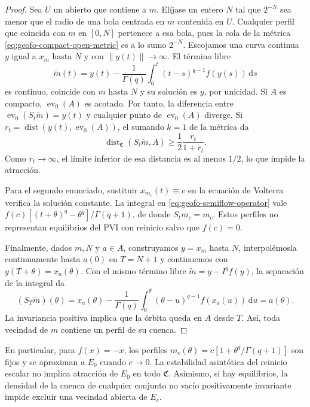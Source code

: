 \begin{proof}
Sea \(U\) un abierto que contiene a \(m\). Elíjase un entero \(N\) tal
que \(2^{-N}\) sea menor que el radio de una bola centrada en \(m\)
contenida en \(U\). Cualquier perfil que coincida con \(m\) en \([0,N]\)
pertenece a esa bola, pues la cola de la métrica
\cref{eq:geofo-compact-open-metric} es a lo sumo \(2^{-N}\).
Escojamos una curva continua \(y\) igual a \(x_m\) hasta \(N\) y con
\(\|y(t)\|\to\infty\). El término libre
\[
 \widetilde m(t)=y(t)-\frac1{\Gamma(q)}
 \int_0^t(t-s)^{q-1}f(y(s))\,\mathrm ds
\]
es continuo, coincide con \(m\) hasta \(N\) y su solución es \(y\), por
unicidad. Si \(A\) es compacto, \(\operatorname{ev}_0(A)\) es acotado.
Por tanto, la diferencia entre \(\operatorname{ev}_0(S_t\widetilde m)=y(t)\)
y cualquier punto de \(\operatorname{ev}_0(A)\) diverge. Si
\(r_t=\operatorname{dist}(y(t),\operatorname{ev}_0(A))\), el sumando
\(k=1\) de la métrica da
\[
 \operatorname{dist}_{\mathfrak C}(S_t\widetilde m,A)
 \geq\frac12\frac{r_t}{1+r_t}.
\]
Como \(r_t\to\infty\), el límite inferior de esa distancia es al menos
\(1/2\), lo que impide la atracción.

Para el segundo enunciado, sustituir \(x_{m_c}(t)\equiv c\) en la ecuación
de Volterra verifica la solución constante. La integral en
\cref{eq:geofo-semiflow-operator} vale
\(f(c)[(t+\theta)^q-\theta^q]/\Gamma(q+1)\), de donde
\(S_tm_c=m_c\). Estos perfiles no representan equilibrios del PVI con
reinicio salvo que \(f(c)=0\).

Finalmente, dados \(m,N\) y \(a\in A\), construyamos \(y=x_m\) hasta
\(N\), interpolémosla continuamente hasta \(a(0)\) en \(T=N+1\) y
continuemos con \(y(T+\theta)=x_a(\theta)\). Con el mismo término libre
\(\widetilde m=y-I^qf(y)\), la separación de la integral da
\[
 (S_T\widetilde m)(\theta)
 =x_a(\theta)-\frac1{\Gamma(q)}
   \int_0^\theta(\theta-u)^{q-1}f(x_a(u))\,\mathrm du
 =a(\theta).
\]
La invariancia positiva implica que la órbita queda en \(A\) desde \(T\).
Así, toda vecindad de \(m\) contiene un perfil de su cuenca.
\end{proof}

En particular, para \(f(x)=-x\), los perfiles
\(m_c(\theta)=c[1+\theta^q/\Gamma(q+1)]\) son fijos y se aproximan a
\(E_0\) cuando \(c\to0\). La estabilidad asintótica del reinicio escalar
no implica atracción de \(E_0\) en todo \(\mathfrak C\). Asimismo, si
hay equilibrios, la densidad de la cuenca de cualquier conjunto no vacío
positivamente invariante impide excluir una vecindad abierta de \(E_e\).

